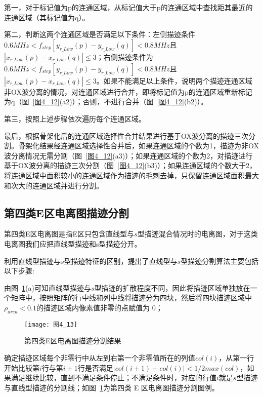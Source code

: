 第一，对于标记值为p的连通区域，从标记值大于p的连通区域中查找距其最近的连通区域（其标记值为q）。

第二，判断这两个连通区域是否满足以下条件：左侧描迹条件$0.6MHz<f_{step} [y_{r\_Low}(p)-y_{r\_Low}(q)]<0.8MHz$且$|x_{r\_Low} (p)-x_{r\_Low} (q)|\leq3$；右侧描迹条件为$0.6MHz<f_{step} [y_{r\_Low}(p)-y_{r\_Low} (q)]<0.8MHz$且$|x_{r\_Low} (p)-x_{r\_Low} (q)|\leq3$。如果不能满足以上条件，说明两个描迹连通区域非OX波分离的情况，对连通区域进行合并，即将标记值为p的连通区域重新标记为q（图~\ref{图4_12}(a2)）；否则，不进行合并（图~\ref{图4_12}(b2)）。
 
第三，按照上述步骤依次遍历每个连通区域。

最后，根据骨架化后的连通区域选择性合并结果进行基于OX波分离的描迹三次分割。骨架化结果经连通区域选择性合并后，如果连通区域的个数为1，描迹为非OX波分离情况无需分割（图~\ref{图4_12}(a3)）；如果连通区域的个数为2，对描迹进行基于OX波分离的描迹三次分割（图~\ref{图4_12}(b3)）；如果连通区域的个数大于2，将连通区域中面积较小的连通区域作为描迹的毛刺去掉，只保留连通区域面积最大和次大的连通区域并进行分割。



\subsection{第四类E区电离图描迹分割}

第四类E区电离图是指E区只包含直线型与$s$型描迹混合情况时的电离图，对于这类电离图我们应把直线型描迹和s型描迹分开。

利用直线型描迹与$s$型描迹特征的区别，提出了直线型与$s$型描迹分割算法主要包括以下步骤:

由图~\ref{图4_13}(a)可知直线型描迹与$s$型描迹的扩散程度不同，因此将描迹区域单独放在一个矩阵中，按照矩阵的行中线和列中线将描迹分为四块，然后将四块描迹区域中$\rho_{area} < 0.1$的描迹区域内像素值非零的点赋值为 0；

\begin{figure}[!ht]
\centering
\texttt{[image: 图4\_13]}
\caption{第四类E区电离图描迹分割结果}
\label{图4_13}
\end{figure}

确定描迹区域每个非零行中从左到右第一个非零值所在的列值$col(i)$，从第一行开始比较第$i$行与第$i + 1$行是否满足$|col(i + 1)-col(i)| < 1/2max(col)$，如果满足继续比较，直到不满足条件停止；不满足条件时，对应的行值$i$就是$s$型描迹与直线型描迹的分割线；如图~\ref{图4_13}为第四类 E 区电离图描迹分割图例。



